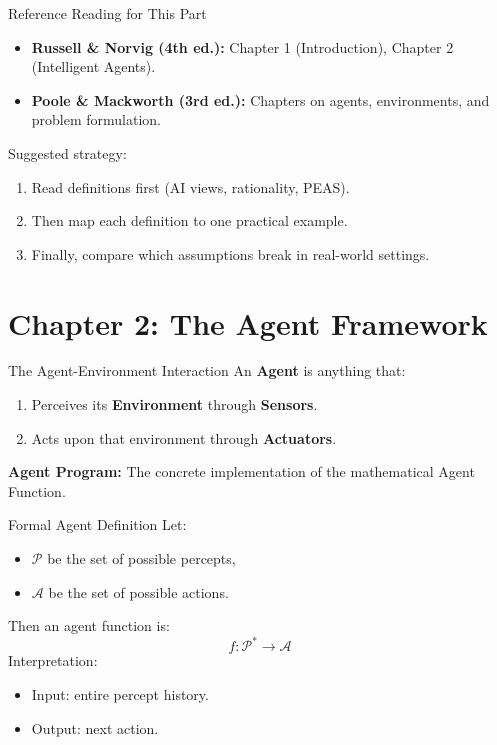 \documentclass[10pt]{beamer}
\begin{document}
\begin{frame}{Reference Reading for This Part}
    \begin{itemize}
        \item \textbf{Russell \& Norvig (4th ed.):} Chapter 1 (Introduction), Chapter 2 (Intelligent Agents).
        \item \textbf{Poole \& Mackworth (3rd ed.):} Chapters on agents, environments, and problem formulation.
    \end{itemize}
    \vspace{0.3cm}
    Suggested strategy:
    \begin{enumerate}
        \item Read definitions first (AI views, rationality, PEAS).
        \item Then map each definition to one practical example.
        \item Finally, compare which assumptions break in real-world settings.
    \end{enumerate}
\end{frame}

\section{Chapter 2: The Agent Framework}

\begin{frame}{The Agent-Environment Interaction}
    An \textbf{Agent} is anything that:
    \begin{enumerate}
        \item Perceives its \textbf{Environment} through \textbf{Sensors}.
        \item Acts upon that environment through \textbf{Actuators}.
    \end{enumerate}
    \vspace{0.3cm}
    \begin{center}
    \end{center}
    \vspace{0.3cm}
    \textbf{Agent Program:} The concrete implementation of the mathematical Agent Function.
\end{frame}

\begin{frame}{Formal Agent Definition}
    Let:
    \begin{itemize}
        \item $\mathcal{P}$ be the set of possible percepts,
        \item $\mathcal{A}$ be the set of possible actions.
    \end{itemize}
    Then an agent function is:
    \[
        f: \mathcal{P}^{*} \rightarrow \mathcal{A}
    \]
    \vspace{0.2cm}
    Interpretation:
    \begin{itemize}
        \item Input: entire percept history.
        \item Output: next action.
    \end{itemize}
\end{frame}
\end{document}

